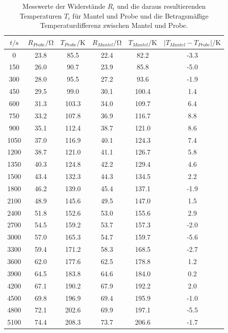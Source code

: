 \begin{table}  %
  \centering
  \caption{Messwerte der Widerstände $R_i$ und die daraus resultierenden Temperaturen $T_i$ für Mantel und Probe und die Betragsmäßige Temperaturdifferenz zwischen Mantel und Probe.}
  \label{tab:Messwerte}
  \begin{tabular}{c c c c c c}
  \toprule
  $t/\si{\second}$ & $R_{Probe}/\si{\ohm}$ & $T_{Probe}/\si{\kelvin}$ & $R_{Mantel}/\si{\ohm}$ & $T_{Mantel}/\si{\kelvin}$ & $|T_{Mantel}-T_{Probe}|/\si{\kelvin}$\\
  \midrule
  0	&	23.8	&	85.5	&	22.4	&	82.2	&	-3.3   \\
  150	&	26.0	&	90.7	&	23.9	&	85.8	&	-5.0   \\
  300	&	28.0	&	95.5	&	27.2	&	93.6	&	-1.9   \\
  450	&	29.5	&	99.0	&	30.1	&	100.4	&	1.4   \\
  600	&	31.3	&	103.3	&	34.0	&	109.7	&	6.4   \\
  750	&	33.2	&	107.8	&	36.9	&	116.7	&	8.8   \\
  900	&	35.1	&	112.4	&	38.7	&	121.0	&	8.6   \\
  1050	&	37.0	&	116.9	&	40.1	&	124.3	&	7.4   \\
  1200	&	38.7	&	121.0	&	41.1	&	126.7	&	5.8   \\
  1350	&	40.3	&	124.8	&	42.2	&	129.4	&	4.6   \\
  1500	&	43.4	&	132.3	&	44.3	&	134.5	&	2.2   \\
  1800	&	46.2	&	139.0	&	45.4	&	137.1	&	-1.9   \\
  2100	&	48.9	&	145.6	&	49.5	&	147.0	&	1.5   \\
  2400	&	51.8	&	152.6	&	53.0	&	155.6	&	2.9   \\
  2700	&	54.5	&	159.2	&	53.7	&	157.3	&	-2.0   \\
  3000	&	57.0	&	165.3	&	54.7	&	159.7	&	-5.6   \\
  3300	&	59.4	&	171.2	&	58.3	&	168.5	&	-2.7   \\
  3600	&	62.0	&	177.6	&	62.5	&	178.8	&	1.2   \\
  3900	&	64.5	&	183.8	&	64.6	&	184.0	&	0.2   \\
  4200	&	67.1	&	190.2	&	67.9	&	192.2	&	2.0   \\
  4500	&	69.8	&	196.9	&	69.4	&	195.9	&	-1.0   \\
  4800	&	72.1	&	202.6	&	69.9	&	197.1	&	-5.5   \\
  5100	&	74.4	&	208.3	&	73.7	&	206.6	&	-1.7   \\

\end{tabular}
\end{table}

